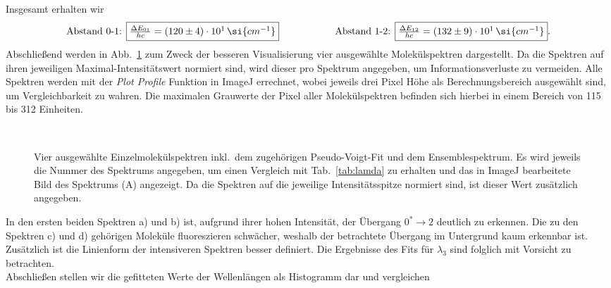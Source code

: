 Insgesamt erhalten wir
\begin{equation}
    \text{Abstand 0-1: }\fbox{$\frac{\Delta{E}_{01}}{hc} = (120\pm4)\cdot10^{1}\,\si{cm^{-1}}$}\hspace{2cm}\text{Abstand 1-2: }\fbox{$\frac{\Delta{E}_{12}}{hc} = (132\pm9)\cdot10^{1}\,\si{cm^{-1}}$}.
\end{equation}
Abschließend werden in Abb.~\ref{fig:spektren} zum Zweck der besseren Visualisierung vier ausgewählte Molekülspektren dargestellt.
Da die Spektren auf ihren jeweiligen Maximal-Intensitätswert normiert sind, wird dieser pro Spektrum angegeben, um Informationsverluste 
zu vermeiden. Alle Spektren werden mit der \textit{Plot Profile} Funktion in ImageJ errechnet, wobei jeweils drei Pixel Höhe 
als Berechnungsbereich ausgewählt sind, um Vergleichbarkeit zu wahren. Die maximalen Grauwerte der Pixel aller Molekülspektren 
befinden sich hierbei in einem Bereich von 115 bis 312 Einheiten.
\begin{figure}[h!]
    \centering
     \\
    \caption{\label{fig:spektren}Vier ausgewählte Einzelmolekülspektren inkl.~dem zugehörigen 
    Pseudo-Voigt-Fit und dem Ensemblespektrum. Es wird jeweils die Nummer des Spektrums angegeben, um 
    einen Vergleich mit Tab.~\ref{tab:lamda} zu erhalten und das in ImageJ bearbeitete Bild des 
    Spektrums (A) angezeigt. Da die Spektren auf die jeweilige Intensitätsspitze normiert sind, 
    ist dieser Wert zusätzlich angegeben.}
\end{figure}  \FloatBarrier
In den ersten beiden Spektren a) und b) ist, aufgrund ihrer hohen Intensität, der 
Übergang $0^{*}\rightarrow2$ deutlich zu erkennen. Die zu den Spektren c) und d) 
gehörigen Moleküle fluoreszieren schwächer, weshalb der betrachtete Übergang im Untergrund 
kaum erkennbar ist. Zusätzlich ist die Linienform der intensiveren Spektren besser definiert.
Die Ergebnisse des Fits für $\lambda_{3}$ sind folglich mit Vorsicht zu betrachten. \\
Abschließen stellen wir die gefitteten Werte der Wellenlängen als Histogramm dar und vergleichen 
